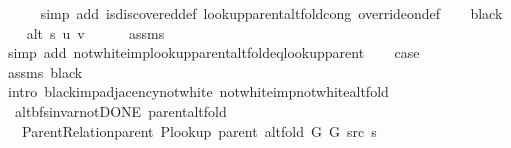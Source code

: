 \begin{isabellebody}
\ \ \ \ \isamarkupfalse%
\ {\isacharparenleft}{\kern0pt}simp\ add{\isacharcolon}{\kern0pt}\ is{\isacharunderscore}{\kern0pt}discovered{\isacharunderscore}{\kern0pt}def\ lookup{\isacharunderscore}{\kern0pt}parent{\isacharunderscore}{\kern0pt}alt{\isacharunderscore}{\kern0pt}fold{\isacharunderscore}{\kern0pt}cong\ override{\isacharunderscore}{\kern0pt}on{\isacharunderscore}{\kern0pt}def{\isacharparenright}{\kern0pt}\isanewline
{}\isamarkupfalse%
\isanewline
\ \ \isamarkupfalse%
\ black\isanewline
\ \ \isamarkupfalse%
\ {\isachardoublequoteopen}alt\ s\ u\ v{\isachardoublequoteclose}\isanewline
\ \ \ \ \isamarkupfalse%
\ assms{\isacharparenleft}{\kern0pt}{}{\isacharparenright}{\kern0pt}\isanewline
\ \ \ \ \isamarkupfalse%
\ {\isacharparenleft}{\kern0pt}simp\ add{\isacharcolon}{\kern0pt}\ not{\isacharunderscore}{\kern0pt}white{\isacharunderscore}{\kern0pt}imp{\isacharunderscore}{\kern0pt}lookup{\isacharunderscore}{\kern0pt}parent{\isacharunderscore}{\kern0pt}alt{\isacharunderscore}{\kern0pt}fold{\isacharunderscore}{\kern0pt}eq{\isacharunderscore}{\kern0pt}lookup{\isacharunderscore}{\kern0pt}parent{\isacharparenright}{\kern0pt}\isanewline
\ \ \isamarkupfalse%
\ {\isacharquery}{\kern0pt}case\isanewline
\ \ \ \ \isamarkupfalse%
\ assms{\isacharparenleft}{\kern0pt}{}{\isacharparenright}{\kern0pt}\ black\isanewline
\ \ \ \ \isamarkupfalse%
\ {\isacharparenleft}{\kern0pt}intro\ black{\isacharunderscore}{\kern0pt}imp{\isacharunderscore}{\kern0pt}adjacency{\isacharunderscore}{\kern0pt}not{\isacharunderscore}{\kern0pt}white\ not{\isacharunderscore}{\kern0pt}white{\isacharunderscore}{\kern0pt}imp{\isacharunderscore}{\kern0pt}not{\isacharunderscore}{\kern0pt}white{\isacharunderscore}{\kern0pt}alt{\isacharunderscore}{\kern0pt}fold{\isacharparenright}{\kern0pt}\isanewline
{}\isamarkupfalse%
%
\endisatagproof
{\isafoldproof}%
%
\isadelimproof
\isanewline
%
\endisadelimproof
%
\isadeliminvisible
\isanewline
%
\endisadeliminvisible
%
\isataginvisible
{}\isamarkupfalse%
\ {\isacharparenleft}{\kern0pt}\ alt{\isacharunderscore}{\kern0pt}bfs{\isacharunderscore}{\kern0pt}invar{\isacharunderscore}{\kern0pt}not{\isacharunderscore}{\kern0pt}DONE{\isacharparenright}{\kern0pt}\ parent{\isacharunderscore}{\kern0pt}alt{\isacharunderscore}{\kern0pt}fold{\isacharcolon}{\kern0pt}\isanewline
\ \ \ {\isachardoublequoteopen}Parent{\isacharunderscore}{\kern0pt}Relation{\isachardot}{\kern0pt}parent\ {\isacharparenleft}{\kern0pt}P{\isacharunderscore}{\kern0pt}lookup\ {\isacharparenleft}{\kern0pt}parent\ {\isacharparenleft}{\kern0pt}alt{\isacharunderscore}{\kern0pt}fold\ G{}\ G{}\ src\ s{\isacharparenright}{\kern0pt}{\isacharparenright}{\kern0pt}{\isacharparenright}{\kern0pt}{\isachardoublequoteclose}%

\end{isabellebody}
